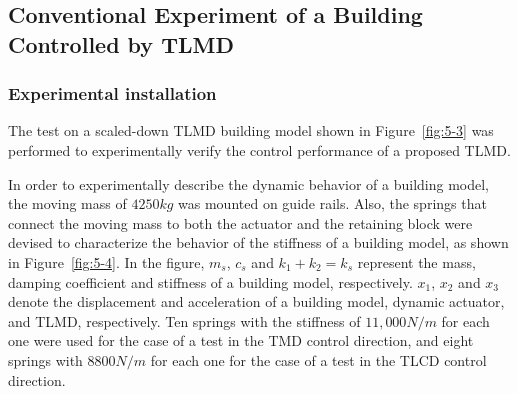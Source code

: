 
\subsection{Conventional Experiment of a Building Controlled by TLMD}

\subsubsection{Experimental installation}

The test on a scaled-down TLMD building model shown in Figure~\ref{fig:5-3} was performed to experimentally verify the control performance of a proposed TLMD.

In order to experimentally describe the dynamic behavior of a building model, the moving mass of $4250 kg$ was mounted on guide rails. Also, the springs that connect the moving mass to both the actuator and the retaining block were devised to characterize the behavior of the stiffness of a building model, as shown in Figure~\ref{fig:5-4}. In the figure, $m_{s}$, $c_{s}$ and $k_{1} + k_{2} = k_{s}$ represent the mass, damping coefficient and stiffness of a building model, respectively. $x_{1}$, $x_{2}$ and $x_{3}$ denote the displacement and acceleration of a building model, dynamic actuator, and TLMD, respectively. Ten springs with the stiffness of $11,000 N/m$ for each one were used for the case of a test in the TMD control direction, and eight springs with $8800 N/m$ for each one for the case of a test in the TLCD control direction.

